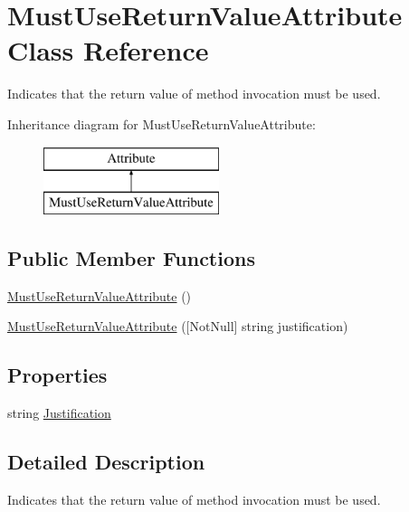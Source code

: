 \hypertarget{class_must_use_return_value_attribute}{}\section{Must\+Use\+Return\+Value\+Attribute Class Reference}
\label{class_must_use_return_value_attribute}


Indicates that the return value of method invocation must be used.  


Inheritance diagram for Must\+Use\+Return\+Value\+Attribute\+:\begin{figure}[H]
\begin{center}
\leavevmode
\includegraphics[height=2.000000cm]{class_must_use_return_value_attribute}
\end{center}
\end{figure}
\subsection*{Public Member Functions}
\begin{DoxyCompactItemize}
\item 
\hyperlink{class_must_use_return_value_attribute_a2ebf268b3db0de70f2660df8ed324f39}{Must\+Use\+Return\+Value\+Attribute} ()
\item 
\hyperlink{class_must_use_return_value_attribute_add5df7b55c856f3bdaf72def203f7eab}{Must\+Use\+Return\+Value\+Attribute} (\mbox{[}Not\+Null\mbox{]} string justification)
\end{DoxyCompactItemize}
\subsection*{Properties}
\begin{DoxyCompactItemize}
\item 
string \hyperlink{class_must_use_return_value_attribute_a1cc4e1cefc25bbf346a0c292b09d541b}{Justification}
\end{DoxyCompactItemize}


\subsection{Detailed Description}
Indicates that the return value of method invocation must be used. 



